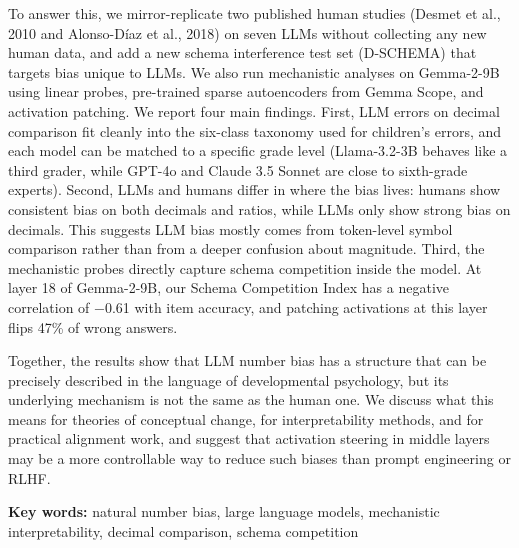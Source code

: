 To answer this, we mirror-replicate two published human studies (Desmet et al., 2010 and Alonso-Díaz et al., 2018) on seven LLMs without collecting any new human data, and add a new schema interference test set (D-SCHEMA) that targets bias unique to LLMs. We also run mechanistic analyses on Gemma-2-9B using linear probes, pre-trained sparse autoencoders from Gemma Scope, and activation patching. We report four main findings. First, LLM errors on decimal comparison fit cleanly into the six-class taxonomy used for children's errors, and each model can be matched to a specific grade level (Llama-3.2-3B behaves like a third grader, while GPT-4o and Claude 3.5 Sonnet are close to sixth-grade experts). Second, LLMs and humans differ in where the bias lives: humans show consistent bias on both decimals and ratios, while LLMs only show strong bias on decimals. This suggests LLM bias mostly comes from token-level symbol comparison rather than from a deeper confusion about magnitude. Third, the mechanistic probes directly capture schema competition inside the model. At layer 18 of Gemma-2-9B, our Schema Competition Index has a negative correlation of −0.61 with item accuracy, and patching activations at this layer flips 47\% of wrong answers.

Together, the results show that LLM number bias has a structure that can be precisely described in the language of developmental psychology, but its underlying mechanism is not the same as the human one. We discuss what this means for theories of conceptual change, for interpretability methods, and for practical alignment work, and suggest that activation steering in middle layers may be a more controllable way to reduce such biases than prompt engineering or RLHF.

\par \noindent \textbf{Key words:} natural number bias, large language models, mechanistic interpretability, decimal comparison, schema competition
